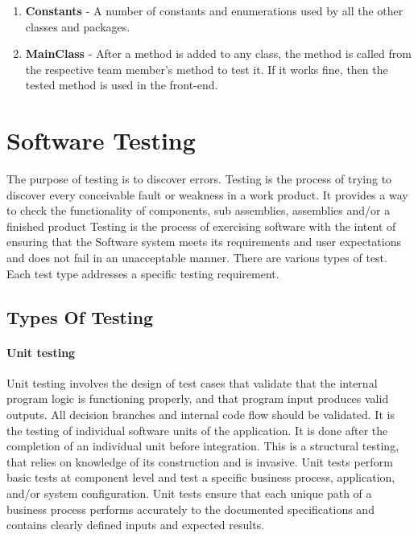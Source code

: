 \documentclass[12pt]{report}
\begin{document}
\begin{enumerate}

\item{\textbf{Constants} - A number of constants and enumerations used by all the other classes and packages.}

\item{\textbf{MainClass} - After a method is added to any class, the method is called from the respective team member's method to test it. If it works fine, then the tested method is used in the front-end.}

\end{enumerate}

\pagestyle{fancy}
\chead{}
\rfoot{\small{\thepage}}
\renewcommand{\headrulewidth}{0.4pt}
\renewcommand{\footrulewidth}{0.4pt}
\chapter{Software Testing}

The purpose of testing is to discover errors. Testing is the process of trying to
discover every conceivable fault or weakness in a work product. It provides a way to
check the functionality of components, sub assemblies, assemblies and/or a finished
product Testing is the process of exercising software with the intent of ensuring that
the Software system meets its requirements and user expectations and does not fail in
an unacceptable manner. There are various types of test. Each test type addresses a
specific testing requirement.
\section{Types Of Testing}
\subsubsection{Unit testing}
Unit testing involves the design of test cases that validate that the internal
program logic is functioning properly, and that program input produces valid outputs.
All decision branches and internal code flow should be validated. It is the testing of
individual software units of the application. It is done after the completion of an
individual unit before integration. This is a structural testing, that relies on knowledge
of its construction and is invasive. Unit tests perform basic tests at component level
and test a specific business process, application, and/or system configuration. Unit
tests ensure that each unique path of a business process performs accurately to the
documented specifications and contains clearly defined inputs and expected results.
\end{document}
